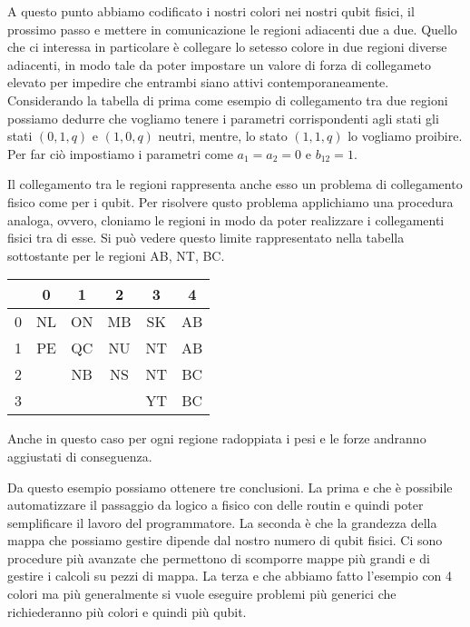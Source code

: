 A questo punto abbiamo codificato i nostri colori nei nostri qubit fisici, il prossimo passo e mettere in comunicazione le regioni adiacenti due a due. Quello che ci interessa in particolare è collegare lo setesso colore in due regioni diverse adiacenti, in modo tale da poter impostare un valore di forza di collegameto elevato per impedire che entrambi siano attivi contemporaneamente. Considerando la tabella di prima come esempio di collegamento tra due regioni possiamo dedurre che vogliamo tenere i parametri corrispondenti agli stati  gli stati $(0,1,q)$ e $(1,0,q)$ neutri, mentre, lo stato $(1,1,q)$ lo vogliamo proibire. Per far ciò impostiamo i parametri come $a_1 = a_2 = 0$ e $b_12 = 1$.

Il collegamento tra le regioni rappresenta anche esso un problema di collegamento fisico come per i qubit. Per risolvere qusto problema applichiamo una procedura analoga, ovvero, cloniamo le regioni in modo da poter realizzare i collegamenti fisici tra di esse. Si può vedere questo limite rappresentato nella tabella sottostante per le regioni AB, NT, BC.
\begin{center}
  \begin{tabular}{ l | c | c | c | c | c }
      & 0  & 1  & 2  & 3  & 4  \\ \hline
    0 & NL & ON & MB & SK & AB \\
    1 & PE & QC & NU & NT & AB \\
    2 &    & NB & NS & NT & BC \\
    3 &    &    &    & YT & BC \\
  \end{tabular}
\end{center}
Anche in questo caso per ogni regione radoppiata i pesi e le forze andranno aggiustati di conseguenza.

Da questo esempio possiamo ottenere tre conclusioni. La prima e che è possibile automatizzare il passaggio da logico a fisico con delle routin e quindi poter semplificare il lavoro del programmatore. La seconda è che la grandezza della mappa che possiamo gestire dipende dal nostro numero di qubit fisici. Ci sono procedure più avanzate che permettono di scomporre mappe più grandi e di gestire i calcoli su pezzi di mappa. La terza e che abbiamo fatto l'esempio con 4 colori ma più generalmente si vuole eseguire problemi più generici che richiederanno più colori e quindi più qubit.

